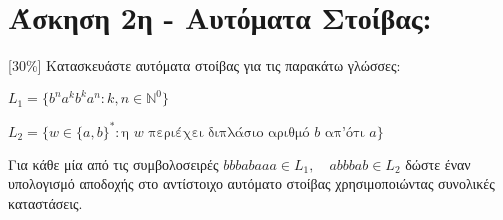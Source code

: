 \section{Άσκηση 2η - Αυτόματα Στοίβας:}
\label{sec:Exercise_2}
\doublespacing

[30\%] Κατασκευάστε αυτόματα στοίβας για τις παρακάτω γλώσσες:

\bm{\textcolor{blue}{(α)}} $L_1 = \{b^n a^k b^k a^n : k, n \in  \mathbb{N}^0 \}$

\bm{\textcolor{blue}{(β)}} $L_2 = \{w \in \{a, b\}^* :  \text{η } w \text{ περιέχει διπλάσιο αριθμό } b
\text{ απ'ότι } a\}$

Για κάθε μία από τις συμβολοσειρές $bbbabaaa \in L_1,\quad abbbab \in L_2$ δώστε έναν υπολογισμό αποδοχής στο
αντίστοιχο αυτόματο στοίβας χρησιμοποιώντας συνολικές καταστάσεις.
\clearpage